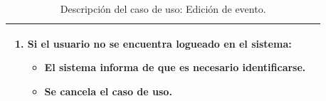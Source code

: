 \begin{table}[H]
\begin{center}
\begin{tabular}{|p{3.5cm}|p{10cm}|}
{\begin{enumerate}
\begin{itemize}
	    \item Se cancela el caso de uso.
	  \end{itemize}
	\item Si el usuario no se encuentra logueado en el sistema:
	\begin{itemize}
	  \item El sistema informa de que es necesario identificarse.
	  \item Se cancela el caso de uso.
	\end{itemize}
	\end{enumerate}
	}\\
      \hline
    \end{tabular}
  \end{center}
\caption{Descripción del caso de uso: Edición de evento.}
\end{table}


